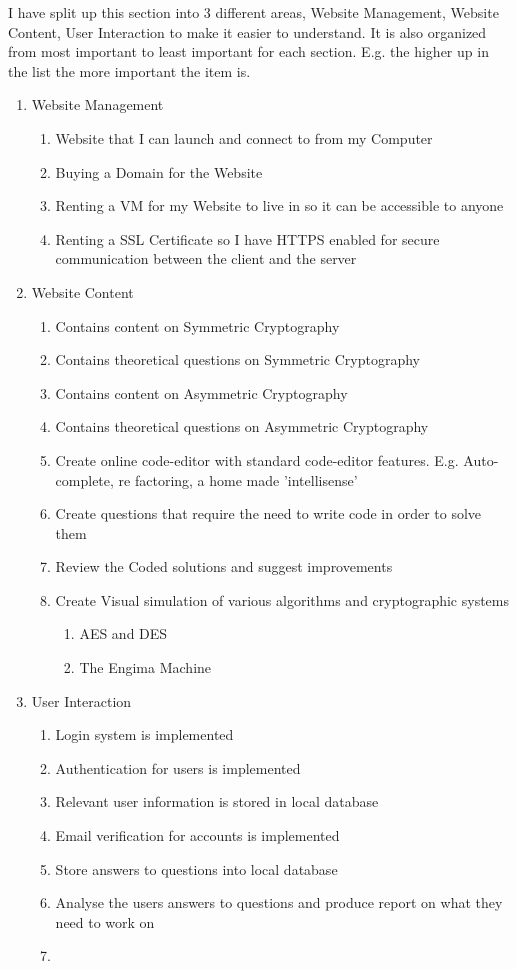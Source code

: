 I have split up this section into 3 different areas, Website Management, Website Content, User Interaction to make it easier to understand. It is also organized from most important to least important for each section. E.g. the higher up in the list the more important the item is. 

\begin{enumerate}
\item{Website Management
	\begin{enumerate}
		\item{Website that I can launch and connect to from my Computer}
		\item{Buying a Domain for the Website}
		\item{Renting a VM for my Website to live in so it can be accessible to anyone}
		\item{Renting a SSL Certificate so I have HTTPS enabled for secure communication between the client and the server}
	\end{enumerate}
}
\item{Website Content
	\begin{enumerate}
		\item{Contains content on Symmetric Cryptography}
		\item{Contains theoretical questions on Symmetric Cryptography}
		\item{Contains content on Asymmetric Cryptography}
		\item{Contains theoretical questions on Asymmetric Cryptography}
		\item{Create online code-editor with standard code-editor features. E.g. Auto-complete, re factoring, a home made 'intellisense'}
		\item{Create questions that require the need to write code in order to solve them}
		\item{Review the Coded solutions and suggest improvements}
		\item{Create Visual simulation of various algorithms and cryptographic systems
			\begin{enumerate}
				\item{AES and DES}
				\item{The Engima Machine}
			\end{enumerate}					
		}
	\end{enumerate}
}
\item{User Interaction
	\begin{enumerate}
		\item{Login system is implemented}
		\item{Authentication for users is implemented}
		\item{Relevant user information is stored in local database}
		\item{Email verification for accounts is implemented}
		\item{Store answers to questions into local database}
		\item{Analyse the users answers to questions and produce report on what they need to work on}
		\item{}
	\end{enumerate}
}
\end{enumerate}

